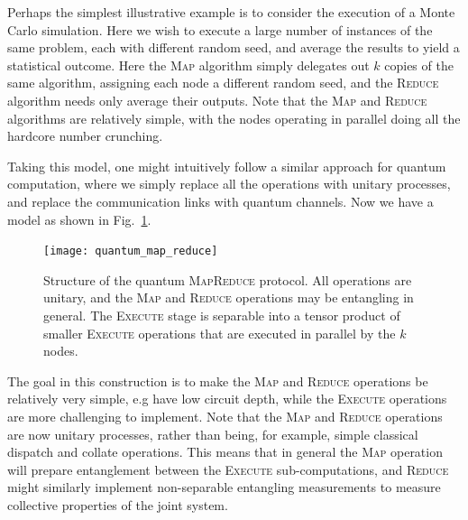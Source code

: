 Perhaps the simplest illustrative example is to consider the execution of a Monte Carlo simulation. Here we wish to execute a large number of instances of the same problem, each with different random seed, and average the results to yield a statistical outcome. Here the \textsc{Map} algorithm simply delegates out $k$ copies of the same algorithm, assigning each node a different random seed, and the \textsc{Reduce} algorithm needs only average their outputs. Note that the \textsc{Map} and \textsc{Reduce} algorithms are relatively simple, with the nodes operating in parallel doing all the hardcore number crunching.

Taking this model, one might intuitively follow a similar approach for quantum computation, where we simply replace all the operations with unitary processes, and replace the communication links with quantum channels. Now we have a model as shown in Fig.~\ref{fig:quant_map_red}.

\begin{figure}
\texttt{[image: quantum\_map\_reduce]}
\caption{Structure of the quantum \textsc{MapReduce} protocol. All operations are unitary, and the \textsc{Map} and \textsc{Reduce} operations may be entangling in general. The \textsc{Execute} stage is separable into a tensor product of smaller \textsc{Execute} operations that are executed in parallel by the $k$ nodes.}\label{fig:quant_map_red}	
\end{figure}

The goal in this construction is to make the \textsc{Map} and \textsc{Reduce} operations be relatively very simple, e.g have low circuit depth, while the \textsc{Execute} operations are more challenging to implement. Note that the \textsc{Map} and \textsc{Reduce} operations are now unitary processes, rather than being, for example, simple classical dispatch and collate operations. This means that in general the \textsc{Map} operation will prepare entanglement between the \textsc{Execute} sub-computations, and \textsc{Reduce} might similarly implement non-separable entangling measurements to measure collective properties of the joint system.

